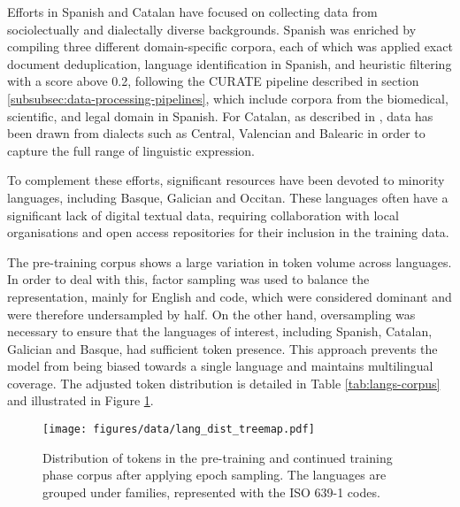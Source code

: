 Efforts in Spanish and Catalan have focused on collecting data from sociolectually and dialectally diverse backgrounds. Spanish was enriched by compiling three different domain-specific corpora, each of which was applied exact document deduplication, language identification in Spanish, and heuristic filtering with a score above 0.2, following the CURATE pipeline described in section \ref{subsubsec:data-processing-pipelines}, which include corpora from the biomedical, scientific, and legal domain in Spanish. For Catalan, as described in \citet{palomar-giner_curated_2024}, data has been drawn from dialects such as Central, Valencian and Balearic in order to capture the full range of linguistic expression.

To complement these efforts, significant resources have been devoted to minority languages, including Basque, Galician and Occitan. These languages often have a significant lack of digital textual data, requiring collaboration with local organisations and open access repositories for their inclusion in the training data.

The pre-training corpus shows a large variation in token volume across languages. In order to deal with this, factor sampling was used to balance the representation, mainly for English and code, which were considered dominant and were therefore undersampled by half. On the other hand, oversampling was necessary to ensure that the languages of interest, including Spanish, Catalan, Galician and Basque, had sufficient token presence. This approach prevents the model from being biased towards a single language and maintains multilingual coverage. The adjusted token distribution is detailed in Table \ref{tab:langs-corpus} and illustrated in Figure \ref{fig:lang_distribution}.

\begin{figure}[htbp!]
    \centering
    \texttt{[image: figures/data/lang\_dist\_treemap.pdf]}
    \caption{Distribution of tokens in the pre-training and continued training phase corpus after applying epoch sampling. The languages are grouped under families, represented with the ISO 639-1 codes.}
    \label{fig:lang_distribution}
\end{figure}






